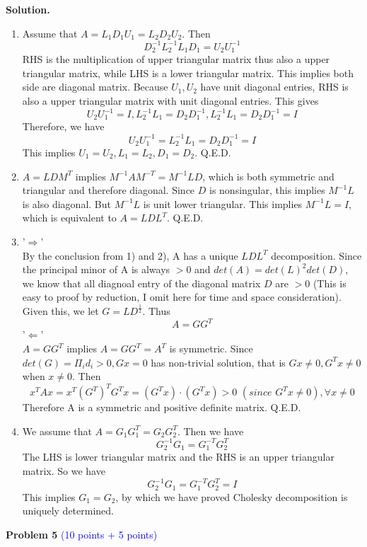 \documentclass[english,onecolumn]{IEEEtran}
\begin{document}
\noindent\textbf{Solution.}
\begin{enumerate}
    \item Assume that $A = L_1D_1U_1=L_2D_2U_2$. Then 
    $$D_2^{-1}L_2^{-1}L_1D_1=U_2U_1^{-1}$$
    RHS is the multiplication of upper triangular matrix thus also a upper triangular matrix, while LHS is a lower triangular matrix. This implies both side are diagonal matrix. Because $U_1,U_2$ have unit diagonal entries, RHS is also a upper triangular matrix with unit diagonal entries. This gives $$U_2U_1^{-1}=I, L_2^{-1}L_1=D_2D_1^{-1}, L_2^{-1}L_1=D_2D_1^{-1} = I$$
    Therefore, we have 
    $$U_2U_1^{-1}=L_2^{-1}L_1=D_2D_1^{-1}=I$$
    This implies $U_1=U_2,L_1=L_2,D_1=D_2$. Q.E.D.
    \item $A=LDM^T$ implies $M^{-1}AM^{-T} = M^{-1}LD$, which is both symmetric and triangular and therefore diagonal. Since $D$ is nonsingular, this implies $M^{-1}L$ is also diagonal. But $M^{-1}L$ is unit lower triangular. This implies $M^{-1}L=I$, which is equivalent to $A = LDL^T$. Q.E.D.
    \item '$\Rightarrow$'\\
    By the conclusion from 1) and 2), A has a unique $LDL^T$ decomposition. Since the principal minor of A is always $>0$ and $det(A)= det(L)^2det(D)$, we know that all diagnoal entry of the diagonal matrix $D$ are $>0$ (This is easy to proof by reduction, I omit here for time and space consideration). Given this, we let $G = LD^{\frac{1}{2}}$. Thus
    $$A = GG^T$$
  	'$\Leftarrow$'\\
  	$A = GG^T$ implies $A=GG^T = A^T$ is symmetric. Since $det(G) = \Pi_i d_i >0, Gx=0$ has non-trivial solution, that is $Gx\ne 0, G^Tx \ne 0$ when $x\ne 0$. Then
  	$$x^TAx = x^T(G^T)^TG^Tx = (G^Tx)\cdot(G^Tx) > 0\,\,(since\,\, G^Tx \ne 0),\forall x\ne 0$$
  	Therefore A is a symmetric and positive definite matrix. Q.E.D. 
    \item We assume that $A = G_1G_1^T = G_2G_2^T$. Then we have 
    $$G_2^{-1}G_1=G_1^{-T}G_2^T$$
    The LHS is lower triangular matrix and the RHS is an upper triangular matrix. So we have
    $$G_2^{-1}G_1=G_1^{-T}G_2^T=I$$
    This implies $G_1=G_2$, by which we have proved Cholesky decomposition is uniquely determined.
\end{enumerate}

\newpage
\noindent\textbf{Problem 5}
\textcolor{blue}{(10 points + 5 points)}
\end{document}
